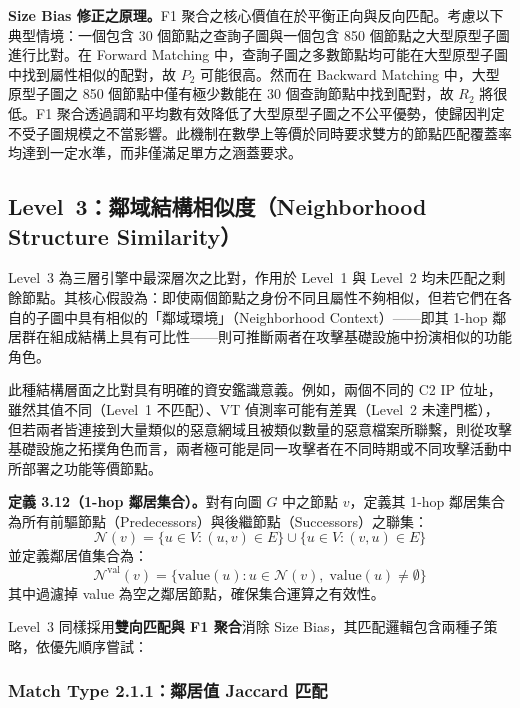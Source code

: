 \begin{ZhChapter}
\textbf{Size Bias 修正之原理。}F1 聚合之核心價值在於平衡正向與反向匹配。考慮以下典型情境：一個包含 30 個節點之查詢子圖與一個包含 850 個節點之大型原型子圖進行比對。在 Forward Matching 中，查詢子圖之多數節點均可能在大型原型子圖中找到屬性相似的配對，故 $P_2$ 可能很高。然而在 Backward Matching 中，大型原型子圖之 850 個節點中僅有極少數能在 30 個查詢節點中找到配對，故 $R_2$ 將很低。F1 聚合透過調和平均數有效降低了大型原型子圖之不公平優勢，使歸因判定不受子圖規模之不當影響。此機制在數學上等價於同時要求雙方的節點匹配覆蓋率均達到一定水準，而非僅滿足單方之涵蓋要求。


\subsection{Level~3：鄰域結構相似度（Neighborhood Structure Similarity）}
\label{subsec:level3}

Level~3 為三層引擎中最深層次之比對，作用於 Level~1 與 Level~2 均未匹配之剩餘節點。其核心假設為：即使兩個節點之身份不同且屬性不夠相似，但若它們在各自的子圖中具有相似的「鄰域環境」（Neighborhood Context）——即其 1-hop 鄰居群在組成結構上具有可比性——則可推斷兩者在攻擊基礎設施中扮演相似的功能角色。

此種結構層面之比對具有明確的資安鑑識意義。例如，兩個不同的 C2 IP 位址，雖然其值不同（Level~1 不匹配）、VT 偵測率可能有差異（Level~2 未達門檻），但若兩者皆連接到大量類似的惡意網域且被類似數量的惡意檔案所聯繫，則從攻擊基礎設施之拓撲角色而言，兩者極可能是同一攻擊者在不同時期或不同攻擊活動中所部署之功能等價節點。

\noindent\textbf{定義 3.12（1-hop 鄰居集合）。}對有向圖 $G$ 中之節點 $v$，定義其 1-hop 鄰居集合為所有前驅節點（Predecessors）與後繼節點（Successors）之聯集：
\begin{equation}
    \mathcal{N}(v) = \{u \in V : (u, v) \in E\} \cup \{u \in V : (v, u) \in E\}
    \label{eq:1hop}
\end{equation}
並定義鄰居值集合為：
\begin{equation}
    \mathcal{N}^{\text{val}}(v) = \{\text{value}(u) : u \in \mathcal{N}(v),\; \text{value}(u) \neq \emptyset\}
    \label{eq:neighbor-val}
\end{equation}
其中過濾掉 value 為空之鄰居節點，確保集合運算之有效性。

Level~3 同樣採用\textbf{雙向匹配與 F1 聚合}消除 Size Bias，其匹配邏輯包含兩種子策略，依優先順序嘗試：

\subsubsection{Match Type 2.1.1：鄰居值 Jaccard 匹配}


\end{ZhChapter}
